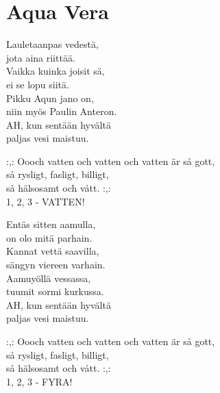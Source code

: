 \section{Aqua Vera}

Lauletaanpas vedestä,\\
jota aina riittää.\\
Vaikka kuinka joisit sä,\\
ei se lopu siitä.\\
Pikku Aqun jano on,\\
niin myös Paulin Anteron.\\
AH, kun sentään hyvältä\\
paljas vesi maistuu.


:,: Oooch vatten och vatten och vatten är så gott,\\
så rysligt, fasligt, billigt,\\
så hälsosamt och vått. :,:\\
1, 2, 3 - VATTEN!


Entäs sitten aamulla,\\
on olo mitä parhain.\\
Kannat vettä saavilla,\\
sängyn viereen varhain.\\
Aamuyöllä vessassa,\\
tuumit sormi kurkussa.\\
AH, kun sentään hyvältä\\
paljas vesi maistuu.


:,: Oooch vatten och vatten och vatten är så gott,\\
så rysligt, fasligt, billigt,\\
så hälsosamt och vått. :,:\\
1, 2, 3 - FYRA!